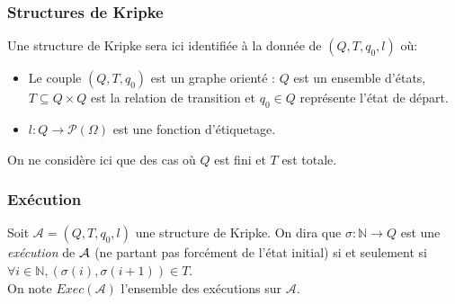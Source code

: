 \documentclass[10pt,a4paper]{article}
\begin{document}
\subsubsection{Structures de Kripke}
Une structure de Kripke sera ici identifiée à la donnée de $(Q,T,q_0,l)$ où:
\begin{itemize}
\item Le couple $(Q,T, q_0)$ est un graphe orienté : $Q$ est un ensemble d'états, $T \subseteq Q \times Q$ est la relation de transition et $q_0 \in Q$ représente l'état de départ.
\item $l : Q \to \mathcal{P}(\Omega)$ est une fonction d'étiquetage.
\end{itemize}
\bigskip
On ne considère ici que des cas où $Q$ est fini et $T$ est totale.

\subsubsection{Exécution}
Soit $\mathcal{A} = (Q,T,q_0,l)$ une structure de Kripke.
On dira que $\sigma : \mathbb{N} \to Q$ est une \emph{exécution} de $\cal{A}$ (ne partant pas forcément de l'état initial) si et seulement si $\forall i \in \mathbb{N}, (\sigma (i), \sigma (i+1)) \in T$.
\\
On note $Exec(\mathcal{A})$ l'ensemble des exécutions sur $\mathcal{A}$.
\end{document}
